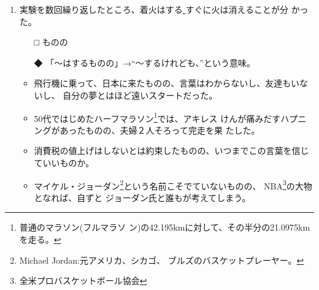 \documentclass[
uplatex,
b5paper,
10pt,
dvipdfmx
]{jsbook}
\begin{document}
\begin{enumerate}
\begin{itemize}
 \item 相次いで、殺人事件が起こった。
 \item 相次いで、両親がこの世を去った。
 \item 英政府は八日夜、シェットランド諸島南部沿岸一帯を禁漁区としたが
       \footnote{1993年英スコットランド北部のシェットランド諸島沿岸でリ
       ベリア船籍タンカー「ブレイア」(89,700t)が座礁し、原油が流出し海上
       汚染事件がおこった。}、同諸島産のサーモンなどの契約キャンセルが相
       次いでいるという。
 \item 昨晩、名神高速道路下り線で、乗用車１台とトラック３台が相次いで追
       突、最後尾のトラックは横転した。
\end{itemize}

\begin{itemize}
 \item[比較] 次々と／に
\end{itemize}
\vspace{5mm}


 \item 実験を数回繰り返したところ、着火はする\underline{   }すぐに火は消えることが分
       かった。 

 \begin{itemize}
  \item[□] ものの
  \item[◆] 「〜はするものの」→``〜するけれども、''という意味。
 \end{itemize}

\begin{itemize}
 \item 飛行機に乗って、日本に来たものの、言葉はわからないし、友達もいな
       いし、 自分の夢とはほど遠いスタートだった。
 \item 50代ではじめたハーフマラソン\footnote{普通のマラソン(フルマラソ
       ン)の42.195kmに対して、その半分の21.0975kmを走る。}では、アキレス
       けんが痛みだすハプニングがあったものの、夫婦２人そろって完走を果
       たした。
 \item 消費税の値上げはしないとは約束したものの、いつまでこの言葉を信じ
       ていいものか。
 \item マイケル・ジョーダン\footnote{Michael Jordan:元アメリカ、シカゴ、
       ブルズのバスケットプレーヤー。}という名前こそでていないものの、
       NBA\footnote{全米プロバスケットボール協会}の大物となれば、自ずと
       ジョーダン氏と誰もが考えてしまう。
\end{itemize}


\end{enumerate}
\end{document}
